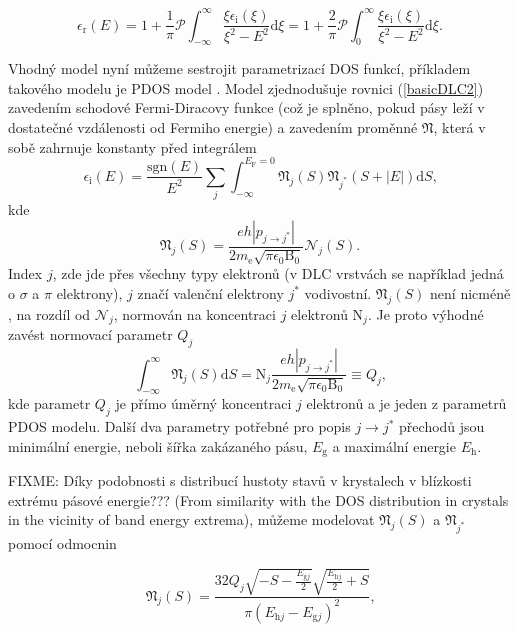 \begin{equation}
\epsilon_\mathrm{r}(E) = 
1 + \frac{1}{\pi} \mathcal{P} \int_{-\infty}^\infty \frac{\xi \epsilon_\mathrm{i}(\xi)}{\xi^2 - E^2} \mathrm{d}\xi = 
1 + \frac{2}{\pi} \mathcal{P} \int_0^\infty \frac{\xi \epsilon_\mathrm{i}(\xi)}{\xi^2 - E^2} \mathrm{d}\xi 
\text{.}
\end{equation}


Vhodný model nyní můžeme sestrojit parametrizací DOS funkcí, příkladem takového modelu je PDOS model \cite{franta2007}. Model zjednodušuje rovnici (\ref{basicDLC2}) zavedením schodové Fermi-Diracovy funkce (což je splněno, pokud pásy leží v dostatečné vzdálenosti od Fermiho energie) a zavedením proměnné $\mathfrak{N}$, která v sobě zahrnuje konstanty před integrálem 
\begin{equation}
\label{epsilonDOS}
\epsilon_\mathrm{i}(E) = \frac{\mathrm{sgn}(E)}{E^2} \sum_{j} \int_{-\infty}^{E_\mathrm{F} = 0} \mathfrak{N}_j(S) \mathfrak{N}_{j^*}(S + |E|)\mathrm{d}S \text{,}
\end{equation}
kde
\begin{equation}
\label{unormN}
\mathfrak{N}_j(S) = \frac{eh | p_{j \rightarrow j^*} |}{2 m_\mathrm{e} \sqrt{\pi \epsilon_0 \mathrm{B}_0}} \mathcal{N}_j(S) \text{.}
\end{equation}
Index $j$, zde jde přes všechny typy elektronů (v DLC vrstvách se například jedná o $\sigma$ a $\pi$ elektrony), $j$ značí valenční elektrony $j^*$ vodivostní. $\mathfrak{N}_j(S)$ není nicméně , na rozdíl od $\mathcal{N}_j$, normován na koncentraci $j$ elektronů $\mathrm{N}_j$. Je proto výhodné zavést normovací parametr $Q_j$
\begin{equation}
\int_{-\infty}^\infty \mathfrak{N}_j(S) \mathrm{d}S = 
\mathrm{N}_j \frac{eh | p_{j \rightarrow j^*} |}{2 m_\mathrm{e} \sqrt{\pi \epsilon_0 \mathrm{B}_0}} \equiv
Q_j \text{,}
\end{equation}
kde parametr $Q_j$ je přímo úměrný koncentraci $j$ elektronů a je jeden z parametrů PDOS modelu. Další dva parametry potřebné pro popis $j \rightarrow j^*$ přechodů jsou minimální energie, neboli šířka zakázaného pásu, $E_\mathrm{g}$ a maximální energie $E_\mathrm{h}$. 

FIXME: Díky podobnosti s distribucí hustoty stavů v krystalech v blízkosti extrému pásové energie???  (From similarity with the DOS distribution in crystals in the vicinity of band energy extrema), můžeme modelovat $\mathfrak{N}_j(S)$ a $\mathfrak{N}_{j^*}$ pomocí odmocnin

\begin{equation}
\label{N1}
 \mathfrak{N}_j(S) = 
\frac{
		32Q_j 
		\sqrt{-S-\frac{E_{\mathrm{g}j}}{2}}
		\sqrt{\frac{E_{\mathrm{h}j}}{2}+S}
	}{
		\pi (E_{\mathrm{h}j} - E_{\mathrm{g}j})^2
	}
\text{,}
\end{equation}

